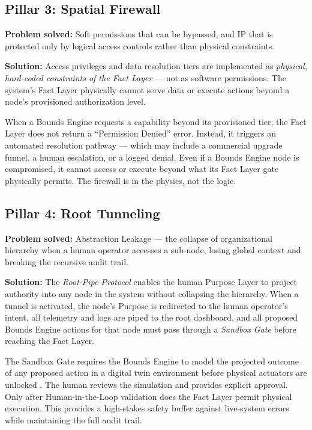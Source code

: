 \documentclass[12pt]{article}
\begin{document}
\subsection{Pillar 3: Spatial Firewall}

\textbf{Problem solved:} Soft permissions that can be bypassed, and IP that is protected only by logical access controls rather than physical constraints.

\textbf{Solution:} Access privileges and data resolution tiers are implemented as \textit{physical, hard-coded constraints of the Fact Layer} --- not as software permissions. The system's Fact Layer physically cannot serve data or execute actions beyond a node's provisioned authorization level.

When a Bounds Engine requests a capability beyond its provisioned tier, the Fact Layer does not return a ``Permission Denied'' error. Instead, it triggers an automated resolution pathway --- which may include a commercial upgrade funnel, a human escalation, or a logged denial. Even if a Bounds Engine node is compromised, it cannot access or execute beyond what its Fact Layer gate physically permits. The firewall is in the physics, not the logic.

\subsection{Pillar 4: Root Tunneling}

\textbf{Problem solved:} Abstraction Leakage --- the collapse of organizational hierarchy when a human operator accesses a sub-node, losing global context and breaking the recursive audit trail.

\textbf{Solution:} The \textit{Root-Pipe Protocol} enables the human Purpose Layer to project authority into any node in the system without collapsing the hierarchy. When a tunnel is activated, the node's Purpose is redirected to the human operator's intent, all telemetry and logs are piped to the root dashboard, and all proposed Bounds Engine actions for that node must pass through a \textit{Sandbox Gate} before reaching the Fact Layer.

The Sandbox Gate requires the Bounds Engine to model the projected outcome of any proposed action in a digital twin environment before physical actuators are unlocked \cite{leveson2011}. The human reviews the simulation and provides explicit approval. Only after Human-in-the-Loop validation does the Fact Layer permit physical execution. This provides a high-stakes safety buffer against live-system errors while maintaining the full audit trail.
\end{document}
